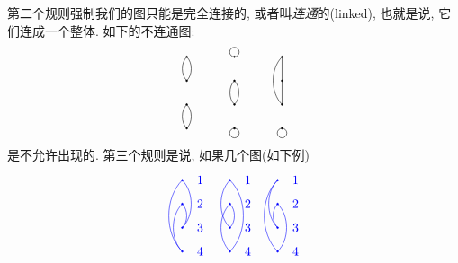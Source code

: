 第二个规则强制我们的图只能是完全连接的, 或者叫\emph{连通}的(linked), 也就是说, 它们连成一个整体. 如下的不连通图:
\begin{equation*}
\begin{tikzpicture}[scale=.667]
\filldraw (0,0) circle(1pt) (2,0)circle (1pt) (4,0) circle(1pt)
          (0,1) circle(1pt) (2,1)circle (1pt) (4,1) circle(1pt)
          (0,2) circle(1pt) (2,2)circle (1pt) (4,2) circle(1pt)
          (0,3) circle(1pt) (2,3)circle (1pt) (4,3) circle(1pt);
\draw	  (0,0) .. controls (.25,.25)   and (.25,.75).. (0,1)
          (0,0) .. controls (-.25,.25)  and (-.25,.75).. (0,1)
		  (0,2) .. controls (.25,2.25)  and (.25,2.75).. (0,3)
		  (0,2) .. controls (-.25,2.25) and (-.25,2.75).. (0,3)
		  (2,3.2) circle(.2cm)
		  (2,2) .. controls+(.25,-.25) and (2.25,1.25)..(2,1)
		  (2,2) .. controls+(-.25,-.25)and (1.75,1.25)..(2,1)
		  (2,-.2) circle(.2cm)
		  (4,3) .. controls+(-.5,-.5) and +(-.5,.5)..(4,1)
		  (4,3) -- (4,1)
		  (4,-.2) circle(.2cm)
		  ;
\end{tikzpicture}
\end{equation*}
是不允许出现的. 第三个规则是说, 如果几个图(如下例)
\begin{equation*}
\begin{tikzpicture}[scale=.667,blue]
\filldraw (0,0) circle(1pt) (2,0)circle (1pt) (4,0) circle(1pt)
          (0,1) circle(1pt) (2,1)circle (1pt) (4,1) circle(1pt)
          (0,2) circle(1pt) (2,2)circle (1pt) (4,2) circle(1pt)
          (0,3) circle(1pt) (2,3)circle (1pt) (4,3) circle(1pt);
\draw	  (0,0) ..controls+(-.75,.75)   and +(-.75,-.75).. (0,3)
          (0,1) ..controls+(.5,.5)   and +(.5,-.5).. (0,3)
          (0,0) ..controls+(-.5,.5)   and +(-.5,-.5).. (0,2)
          (0,1) ..controls+(.25,.25) and +(.25,-.25).. (0,2)
          
          (2,0) ..controls+(.75,.75)and+(.75,-.75)..(2,3) 
          (2,1) ..controls+(-.5,.5)and+(-.5,-.5)..(2,3)
          (2,0) ..controls+(-.5,.5)and+(-.5,-.5)..(2,2)
          (2,1) ..controls+(.25,.25)and+(.25,-.25)..(2,2)
          
          (4,0) ..controls+(-.75,.75)and+(-.75,-.75)..(4,3)
          (4,1) ..controls+(-.5,.5)and+(-.5,-.5)..(4,3)
          (4,1) ..controls+(-.25,.25)and+(-.25,-.25)..(4,2) 
          (4,0) ..controls+(.5,.5)and+(.5,-.5)..(4,2)
;
\draw     (.75,0)node{4} (.75,1)node{3} (.75,2)node{2} (.75,3)node{1}
		  (2.75,0)node{4} (2.75,1)node{3} (2.75,2)node{2} (2.75,3)node{1}
		  (4.75,0)node{4} (4.75,1)node{3} (4.75,2)node{2} (4.75,3)node{1}
;
\end{tikzpicture}
\end{equation*}
